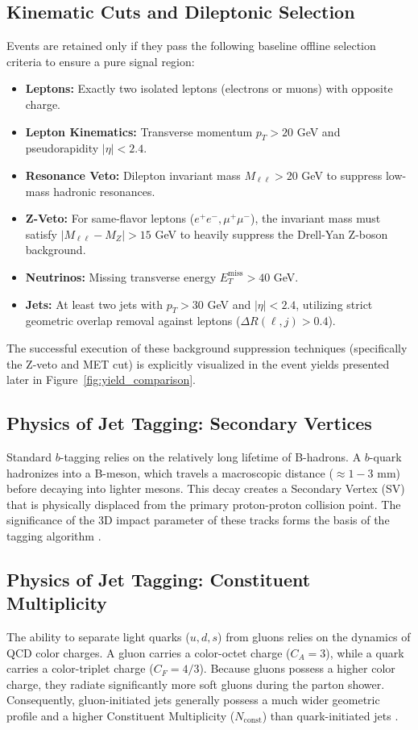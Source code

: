 \documentclass[11pt,a4paper]{article}
\begin{document}
\subsection{Kinematic Cuts and Dileptonic Selection}
Events are retained only if they pass the following baseline offline selection criteria to ensure a pure signal region:
\begin{itemize}
    \item \textbf{Leptons:} Exactly two isolated leptons (electrons or muons) with opposite charge.
    \item \textbf{Lepton Kinematics:} Transverse momentum $p_T > 20$ GeV and pseudorapidity $|\eta| < 2.4$.
    \item \textbf{Resonance Veto:} Dilepton invariant mass $M_{\ell\ell} > 20$ GeV to suppress low-mass hadronic resonances.
    \item \textbf{Z-Veto:} For same-flavor leptons ($e^{+}e^{-}, \mu^{+}\mu^{-}$), the invariant mass must satisfy $|M_{\ell\ell} - M_Z| > 15$ GeV to heavily suppress the Drell-Yan Z-boson background.
    \item \textbf{Neutrinos:} Missing transverse energy $E_T^{\text{miss}} > 40$ GeV.
    \item \textbf{Jets:} At least two jets with $p_T > 30$ GeV and $|\eta| < 2.4$, utilizing strict geometric overlap removal against leptons ($\Delta R(\ell, j) > 0.4$).
\end{itemize}
The successful execution of these background suppression techniques (specifically the Z-veto and MET cut) is explicitly visualized in the event yields presented later in Figure~\ref{fig:yield_comparison}.

\subsection{Physics of Jet Tagging: Secondary Vertices}
Standard $b$-tagging relies on the relatively long lifetime of B-hadrons. A $b$-quark hadronizes into a B-meson, which travels a macroscopic distance ($\approx 1-3$ mm) before decaying into lighter mesons. This decay creates a Secondary Vertex (SV) that is physically displaced from the primary proton-proton collision point. The significance of the 3D impact parameter of these tracks forms the basis of the tagging algorithm \cite{cms_paper}.

\subsection{Physics of Jet Tagging: Constituent Multiplicity}
The ability to separate light quarks ($u, d, s$) from gluons relies on the dynamics of QCD color charges. A gluon carries a color-octet charge ($C_A = 3$), while a quark carries a color-triplet charge ($C_F = 4/3$). Because gluons possess a higher color charge, they radiate significantly more soft gluons during the parton shower. Consequently, gluon-initiated jets generally possess a much wider geometric profile and a higher Constituent Multiplicity ($N_{\text{const}}$) than quark-initiated jets \cite{cms_paper}.
\end{document}
